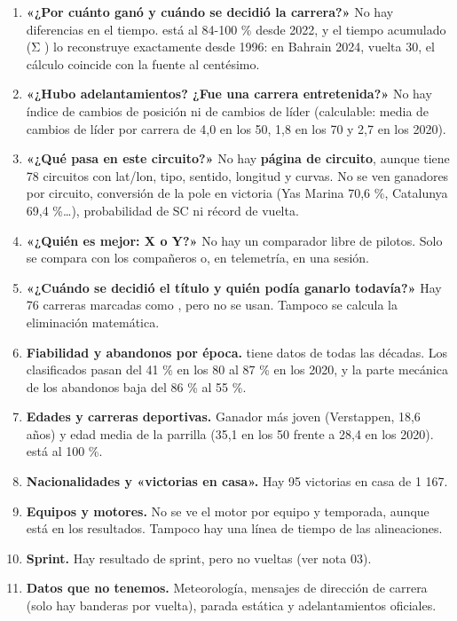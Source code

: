 \begin{enumerate}
\item \textbf{«¿Por cuánto ganó y cuándo se decidió la carrera?»} No hay diferencias en el tiempo.  está al 84-100 \% desde 2022, y el tiempo acumulado (Σ ) lo reconstruye exactamente desde 1996: en Bahrain 2024, vuelta 30, el cálculo coincide con la fuente al centésimo.
\item \textbf{«¿Hubo adelantamientos? ¿Fue una carrera entretenida?»} No hay índice de cambios de posición ni de cambios de líder (calculable: media de cambios de líder por carrera de 4,0 en los 50, 1,8 en los 70 y 2,7 en los 2020).
\item \textbf{«¿Qué pasa en este circuito?»} No hay \textbf{página de circuito}, aunque  tiene 78 circuitos con lat/lon, tipo, sentido, longitud y curvas. No se ven ganadores por circuito, conversión de la pole en victoria (Yas Marina 70,6 \%, Catalunya 69,4 \%…), probabilidad de SC ni récord de vuelta.
\item \textbf{«¿Quién es mejor: X o Y?»} No hay un comparador libre de pilotos. Solo se compara con los compañeros o, en telemetría, en una sesión.
\item \textbf{«¿Cuándo se decidió el título y quién podía ganarlo todavía?»} Hay 76 carreras marcadas como , pero no se usan. Tampoco se calcula la eliminación matemática.
\item \textbf{Fiabilidad y abandonos por época.}  tiene datos de todas las décadas. Los clasificados pasan del 41 \% en los 80 al 87 \% en los 2020, y la parte mecánica de los abandonos baja del 86 \% al 55 \%.
\item \textbf{Edades y carreras deportivas.} Ganador más joven (Verstappen, 18,6 años) y edad media de la parrilla (35,1 en los 50 frente a 28,4 en los 2020).  está al 100 \%.
\item \textbf{Nacionalidades y «victorias en casa».} Hay 95 victorias en casa de 1 167.
\item \textbf{Equipos y motores.} No se ve el motor por equipo y temporada, aunque  está en los resultados. Tampoco hay una línea de tiempo de las alineaciones.
\item \textbf{Sprint.} Hay resultado de sprint, pero no vueltas (ver nota 03).
\item \textbf{Datos que no tenemos.} Meteorología, mensajes de dirección de carrera (solo hay banderas por vuelta), parada estática y adelantamientos oficiales.
\end{enumerate}

